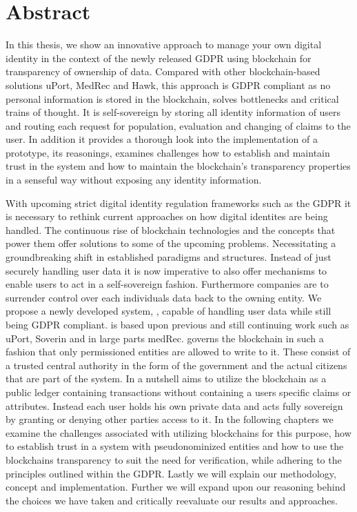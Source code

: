 \chapter*{Abstract}
\label{cha:abstract}

In this thesis, we show an innovative approach to manage your own digital identity in the context
of the newly released GDPR using blockchain for transparency of ownership of data.
Compared with other blockchain-based solutions uPort, MedRec and Hawk,
this approach is GDPR compliant as no personal information is stored in the blockchain, solves bottlenecks and critical
trains of thought.
It is self-sovereign by storing all identity information of users and routing each request for population, evaluation and
changing of claims to the user.
In addition it provides a thorough look into the implementation of a prototype, its reasonings, examines challenges
how to establish and maintain trust in the system and how to maintain the blockchain's transparency properties in a
senseful way without exposing any identity information.

With upcoming strict digital identity regulation frameworks such as the GDPR\cite{gdpr} it is necessary to 
rethink current approaches on how digital identites are being handled. The continuous rise of blockchain technologies and the concepts that power them offer solutions to some of the upcoming problems. Necessitating a groundbreaking shift in established paradigms and structures.
Instead of just securely handling user data it is now imperative to also offer mechanisms to enable users to act in a self-sovereign fashion. Furthermore companies are to surrender control over each individuals data back to the owning entity. 
We propose a newly developed system, \projectName{}, capable of handling user data while still being GDPR compliant. \projectName{} is based upon previous and still continuing work such as uPort\cite{uPortWhitePaper}, Soverin\cite{} and in large parts medRec\cite{azaria2016medrec}.
\projectName{} governs the blockchain in such a fashion that only permissioned entities are allowed to write to it. These consist of a trusted central authority in the form of the government and the actual citizens that are part of the system. 
In a nutshell \projectName{} aims to utilize the blockchain as a public ledger containing transactions without containing a users specific claims or attributes. Instead each user holds his own private data and acts fully sovereign by granting or denying other parties access to it.
In the following chapters we examine the challenges associated with utilizing blockchains for this purpose, how to establish trust in a system with pseudonominized entities and how to use the blockchains transparency to suit the need for verification, while adhering to the principles outlined within the GDPR\cite{gdpr}.
Lastly we will explain our methodology, concept and implementation. Further we will expand upon our reasoning behind the choices we have taken and critically reevaluate our results and approaches. 